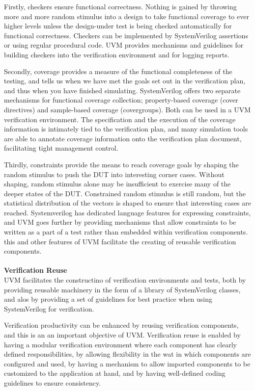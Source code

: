 \documentclass[a4paper,11pt]{article}
\begin{document}
Firstly, checkers ensure functional correctness. Nothing is gained by throwing more and more random stimulus into a design to take functional coverage to ever higher levels unless the design-under test is being checked automatically for functional correctness. Checkers can be implemented by SystemVerilog assertions or using regular procedural code. UVM provides mechanisms and guidelines for building checkers into the verification environment and for logging reports.

Secondly, coverage provides a measure of the functional completeness of the testing, and tells us when we have met the goals set out in the verification plan, and thus when you have finished simulating. SystemVerilog offers two separate mechanisms for functional coverage collection; property-based coverage (cover directives) and sample-based coverage (covergroups). Both can be used in a UVM verification environment. The specification and the execution of the coverage information is intimately tied to the verification plan, and many simulation tools are able to annotate coverage information onto the verification plan document, facilitating tight management control.

Thirdly, constraints provide the means to reach coverage goals by shaping the random stimulus to push the DUT into interesting corner cases. Without shaping, random stimulus alone may be insufficient to exercise many of the deeper states of the DUT. Constrained random stimulus is still random, but the statistical distribution of the vectors is shaped to ensure that interesting cases are reached. Systemverilog has dedicated language features for expressing constraints, and UVM goes further by providing mechanisms that allow constraints to be written as a part of a test rather than embedded within verification components. this and other features of UVM facilitate the creating of reusable verification components.
\ \\
\ \\
\textbf{Verification Reuse}
\ \\
UVM facilitates the constructino of verification environments and tests, both by providing reusable machinery in the form of a library of SystemVerilog classes, and alos by providing a set of guidelines for best practice when using SystemVerilog for verification.

Verification productivity can be enhanced by reusing verification components, and this is an an important objective of UVM. Verification reuse is enabled by having a modular verification environment where each component has clearly defined responsibilities, by allowing flexibility in the wat in which components are configured and used, by having a mechanism to allow imported components to be customized to the application at hand, and by having well-defined coding guidelines to ensure consistency.
\end{document}
